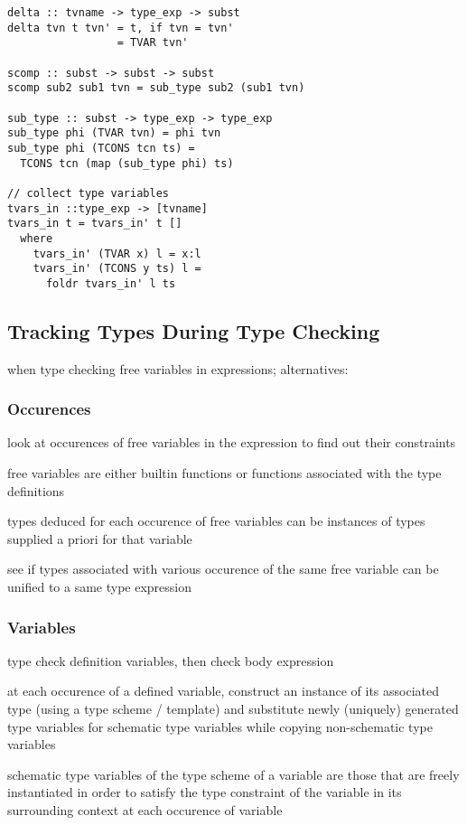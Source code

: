 \documentclass[8pt]{extarticle}
\begin{document}
\begin{multicols*}{2}
\begin{verbatim}
delta :: tvname -> type_exp -> subst
delta tvn t tvn' = t, if tvn = tvn'
                 = TVAR tvn'

scomp :: subst -> subst -> subst
scomp sub2 sub1 tvn = sub_type sub2 (sub1 tvn)

sub_type :: subst -> type_exp -> type_exp
sub_type phi (TVAR tvn) = phi tvn
sub_type phi (TCONS tcn ts) =
  TCONS tcn (map (sub_type phi) ts)

// collect type variables
tvars_in ::type_exp -> [tvname]
tvars_in t = tvars_in' t []
  where
    tvars_in' (TVAR x) l = x:l
    tvars_in' (TCONS y ts) l =
      foldr tvars_in' l ts
\end{verbatim}

\vfill\null
\columnbreak

\subsection{Tracking Types During Type Checking}

when type checking free variables in expressions; alternatives:

\subsubsection{Occurences}
look at occurences of free variables in the expression to find out their constraints

free variables are either builtin functions or functions associated with the type definitions

types deduced for each occurence of free variables can be instances of types supplied a priori for that variable

see if types associated with various occurence of the same free variable can be unified to a same type expression

\subsubsection{Variables}
type check definition variables, then check body expression

at each occurence of a defined variable, construct an instance of its associated type (using a type scheme / template) and substitute newly (uniquely) generated type variables for schematic type variables while copying non-schematic type variables

schematic type variables of the type scheme of a variable are those that are freely instantiated in order to satisfy the type constraint of the variable in its surrounding context at each occurence of variable


\end{multicols*}
\end{document}

